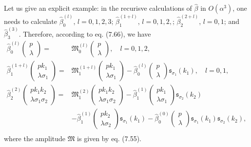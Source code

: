 Let us give an explicit example: in the recurisve calculations of $\hat{\beta}$ in $O(\alpha^3)$, one needs to calculate $\hat{\beta}^{(l)}_0$, $l=0,1,2,3$; $\hat{\beta}^{(1+l)}_1$, $l=0,1,2,$; $\hat{\beta}^{(2+l)}_2$, $l=0,1$; and  $\hat{\beta}^{(3)}_3$. Therefore, according to eq. (7.66), we have
\begin{align}
\hat{\beta}^{(l)}_0\left(
\begin{array}{c}
p\\\lambda
\end{array}
\right)=&\mathfrak{M}^{(l)}_0\left(
\begin{array}{c}
p\\\lambda
\end{array}
\right),\quad l=0,1,2,\nonumber\\
\hat{\beta}^{(1+l)}_1\left(
\begin{array}{c}
pk_1\\\lambda\sigma_1
\end{array}
\right)=&\mathfrak{M}^{(1+l)}_1\left(
\begin{array}{c}
pk_1\\\lambda\sigma_1
\end{array}
\right)-\hat{\beta}^{(l)}_0\left(
\begin{array}{c}
p\\\lambda
\end{array}
\right)\mathfrak{s}_{\sigma_1}(k_1),\quad l=0,1,\nonumber\\
\hat{\beta}^{(2)}_2\left(
\begin{array}{c}
pk_1k_2\\\lambda\sigma_1\sigma_2
\end{array}
\right)=&\mathfrak{M}^{(2)}_1\left(
\begin{array}{c}
pk_1k_2\\\lambda\sigma_1\sigma_2
\end{array}
\right)-\hat{\beta}^{(1)}_1\left(
\begin{array}{c}
pk_1\\\lambda\sigma_1
\end{array}
\right)\mathfrak{s}_{\sigma_2}(k_2)\nonumber\\
&-\hat{\beta}^{(1)}_1\left(
\begin{array}{c}
pk_2\\\lambda\sigma_2
\end{array}
\right)\mathfrak{s}_{\sigma_1}(k_1)-\hat{\beta}^{(0)}_0\left(
\begin{array}{c}
p\\\lambda
\end{array}
\right)\mathfrak{s}_{\sigma_1}(k_1)\mathfrak{s}_{\sigma_2}(k_2),\nonumber\\
\end{align}
where the amplitude $\mathfrak{M}$ is given by eq. (7.55).

